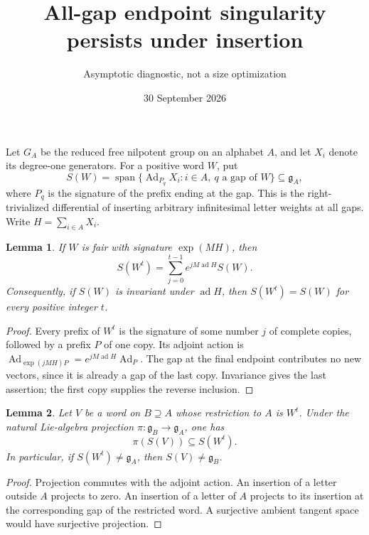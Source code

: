 \documentclass[11pt]{article}
\title{All-gap endpoint singularity persists under insertion}
\author{Asymptotic diagnostic, not a size optimization}
\date{30 September 2026}
\newtheorem{lemma}{Lemma}
\begin{document}
\maketitle
Let $G_A$ be the reduced free nilpotent group on an alphabet $A$, and let
$X_i$ denote its degree-one generators. For a positive word $W$, put
\[
 S(W)=\operatorname{span}\{\operatorname{Ad}_{P_q}X_i:
                i\in A,\ q\text{ a gap of }W\}\subseteq\mathfrak g_A,
\]
where $P_q$ is the signature of the prefix ending at the gap. This is the
right-trivialized differential of inserting arbitrary infinitesimal
letter weights at all gaps. Write $H=\sum_{i\in A}X_i$.

\begin{lemma}
If $W$ is fair with signature $\exp(MH)$, then
\[
 S(W^t)=\sum_{j=0}^{t-1}e^{jM\operatorname{ad}H}S(W).
\]
Consequently, if $S(W)$ is invariant under $\operatorname{ad}H$, then
$S(W^t)=S(W)$ for every positive integer $t$.
\end{lemma}
\begin{proof}
Every prefix of $W^t$ is the signature of some number $j$ of complete
copies, followed by a prefix $P$ of one copy. Its adjoint action is
$\operatorname{Ad}_{\exp(jMH)P}=e^{jM\operatorname{ad}H}\operatorname{Ad}_P$.
The gap at the final endpoint contributes no new vectors, since it is
already a gap of the last copy. Invariance gives the last assertion;
the first copy supplies the reverse inclusion.
\end{proof}

\begin{lemma}
Let $V$ be a word on $B\supseteq A$ whose restriction to $A$ is $W^t$.
Under the natural Lie-algebra projection $\pi:\mathfrak g_B\to
\mathfrak g_A$, one has
\[
 \pi(S(V))\subseteq S(W^t).
\]
In particular, if $S(W^t)\ne\mathfrak g_A$, then
$S(V)\ne\mathfrak g_B$.
\end{lemma}
\begin{proof}
Projection commutes with the adjoint action. An insertion of a letter
outside $A$ projects to zero. An insertion of a letter of $A$ projects
to its insertion at the corresponding gap of the restricted word.
A surjective ambient tangent space would have surjective projection.
\end{proof}
\end{document}
